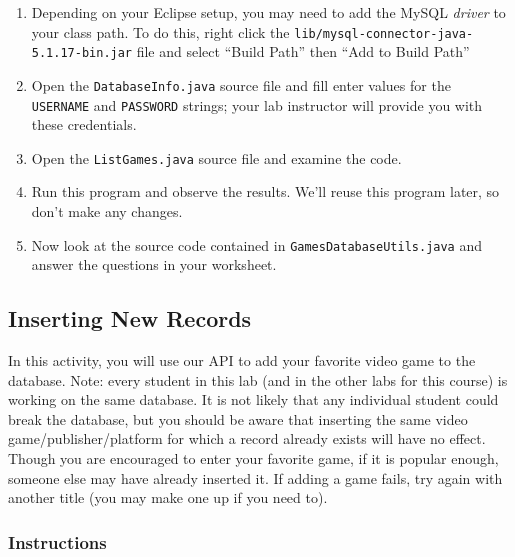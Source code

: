 \documentclass[12pt]{scrartcl}
\begin{document}
\begin{enumerate}
  \item Depending on your Eclipse setup, you may need to add the MySQL
  \emph{driver} to your class path.  To do this, right click the 
  \texttt{lib/mysql-connector-java-5.1.17-bin.jar} file and
  select ``Build Path'' then ``Add to Build Path''
  \item Open the \texttt{DatabaseInfo.java} source file and
  	fill enter values for the \texttt{USERNAME} and 
	\texttt{PASSWORD} strings; your lab instructor
	will provide you with these credentials.
  \item Open the \texttt{ListGames.java} source file and examine 
	the code.  
  \item Run this program and observe the results.  We'll reuse this program later, so don't 
	make any changes.
  \item Now look at the source code contained in \texttt{GamesDatabaseUtils.java} 
	and answer the questions in your worksheet.
\end{enumerate}

\subsection{Inserting New Records}

In this activity, you will use our API to add your favorite video game to 
the database.  Note: every student in this lab (and in the other labs for 
this course) is working on the same database.  It is not likely that any 
individual student could break the database, but you should be aware 
that inserting the same video game/publisher/platform for which a 
record already exists will have no effect.  Though you are encouraged 
to enter your favorite game, if it is popular enough, someone else may 
have already inserted it.  If adding a game fails, try again with another 
title (you may make one up if you need to).

\subsubsection*{Instructions}
\end{document}
